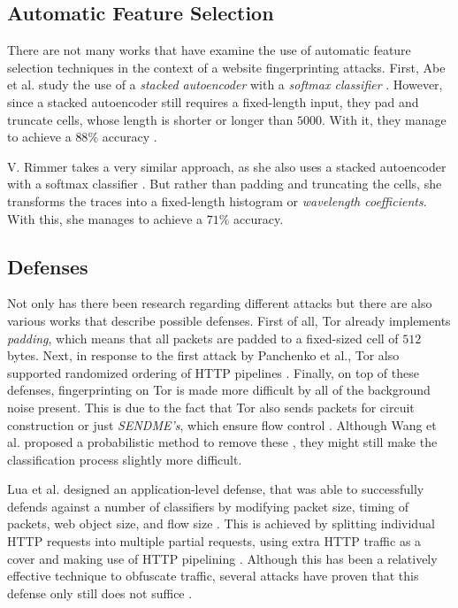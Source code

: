 \subsection{Automatic Feature Selection}

There are not many works that have examine the use of automatic feature selection techniques in the context of a website fingerprinting attacks.
First, Abe et al. study the use of a \textit{stacked autoencoder} with a \textit{softmax classifier} \cite{deeplearning}.
However, since a stacked autoencoder still requires a fixed-length input, they pad and truncate cells, whose length is shorter or longer than $5000$.
With it, they manage to achieve a $88\%$ accuracy \cite{deeplearning}.

V. Rimmer takes a very similar approach, as she also uses a stacked autoencoder with a softmax classifier \cite{deeplearningthesis}.
But rather than padding and truncating the cells, she transforms the traces into a fixed-length histogram or \textit{wavelength coefficients}.
With this, she manages to achieve a $71\%$ accuracy.

\newpage

\subsection{Defenses} \label{sec:defenses}

Not only has there been research regarding different attacks but there are also various works that describe possible defenses.
First of all, Tor already implements \textit{padding}, which means that all packets are padded to a fixed-sized cell of $512$ bytes.
Next, in response to the first attack by Panchenko et al., Tor also supported randomized ordering of HTTP pipelines \cite{panchenko1, kfingerprinting, perry2011experimental}.
Finally, on top of these defenses, fingerprinting on Tor is made more difficult by all of the background noise present.
This is due to the fact that Tor also sends packets for circuit construction or just \textit{SENDME's}, which ensure flow control \cite{panchenko2}.
Although Wang et al. proposed a probabilistic method to remove these \cite{wang_goldberg_2013}, they might still make the classification process slightly more difficult.

Lua et al. designed an application-level defense, that was able to successfully defends against a number of classifiers by modifying packet size, timing of packets, web object size, and
flow size \cite{perry2011experimental}. This is achieved by splitting individual HTTP requests into multiple partial requests, using extra HTTP traffic as a cover and making use of HTTP pipelining \cite{cai_zhang_joshi_johnson_2012}.
Although this has been a relatively effective technique to obfuscate traffic, several attacks have proven that this defense only still does not suffice \cite{cai_zhang_joshi_johnson_2012,wang_cai_johnson_nithyanand_goldberg_2014}.

